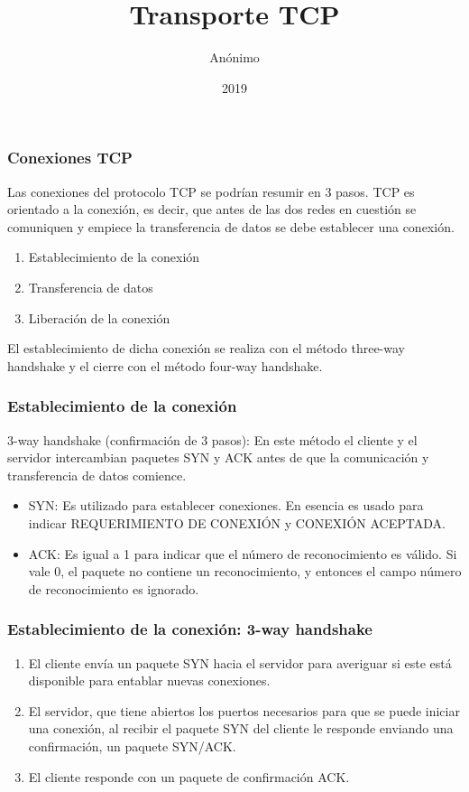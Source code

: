 \documentclass{beamer}
\title{Transporte TCP}
\author{Anónimo}
\institute{Instituto Politécnico Superior Gral. San Martín}
\date{2019}
\begin{document}
 
\frame{\titlepage}
 
\begin{frame}
\frametitle{Conexiones TCP}
Las conexiones del protocolo TCP se podrían resumir en 3 pasos.
TCP es orientado a la conexión, es decir, que antes de las dos redes en cuestión se comuniquen y empiece la transferencia de datos se debe establecer una conexión.
\vspace{5mm}
\begin{enumerate}
\item Establecimiento de la conexión
\item Transferencia de datos
\item Liberación de la conexión
\end{enumerate}

\vspace{5mm}

El establecimiento de dicha conexión se realiza con el método three-way handshake y el cierre con el método four-way handshake.

\end{frame}

\begin{frame}
\frametitle{Establecimiento de la conexión}
3-way handshake (confirmación de 3 pasos): En este método el cliente y el servidor intercambian paquetes SYN y ACK antes de que la comunicación y transferencia de datos comience.
\vspace{5mm}
\begin{itemize}
\item SYN: Es utilizado para establecer conexiones. En esencia es usado para indicar REQUERIMIENTO DE CONEXIÓN y CONEXIÓN ACEPTADA.
\item ACK: Es igual a 1 para indicar que el número de reconocimiento es válido. Si vale 0, el paquete no contiene un reconocimiento, y entonces el campo número de reconocimiento es ignorado.
\end{itemize}
\end{frame}

\begin{frame}
\frametitle{Establecimiento de la conexión: 3-way handshake}
\begin{enumerate}
\item El cliente envía un paquete SYN hacia el servidor para averiguar si este está disponible para entablar nuevas conexiones.
\item El servidor, que tiene abiertos los puertos necesarios para que se puede iniciar una conexión, al recibir el paquete SYN del cliente le responde enviando una confirmación, un paquete SYN/ACK.
\item El cliente responde con un paquete de confirmación ACK.
\end{enumerate}
\end{frame}
\end{document}
